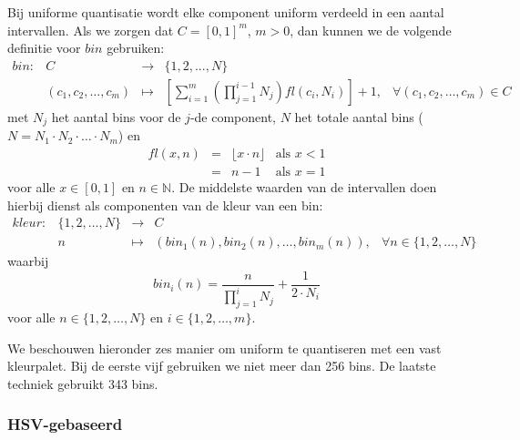 Bij uniforme quantisatie wordt elke component uniform verdeeld in een aantal intervallen.
Als we zorgen dat $C=[0,1]^m$, $m > 0$, dan kunnen we 
de volgende definitie voor $bin$ gebruiken:
$$
\begin{array}{lrcll}
bin: & C & \to & \{1,2,...,N\}\\
     & (c_1,c_2,\ldots,c_m) & \mapsto & \left[ \sum_{i=1}^m \left( \prod_{j=1}^{i-1} N_j \right) \mathit{fl}(c_i, N_i) \right] + 1, & \forall (c_1,c_2,\ldots,c_m) \in C
\end{array}
$$
met $N_j$ het aantal bins voor de $j$-de component, $N$ het totale aantal bins 
($N=N_1 \cdot N_2 \cdot \ldots \cdot N_m$) en
$$
\begin{array}{rcll}
\mathit{fl}(x,n) & = & \lfloor x \cdot n \rfloor & \textrm{als } x < 1 \\
				 & = & n - 1 & \textrm{als } x = 1
\end{array}
$$
voor alle $x \in [0,1]$ en $n \in \mathbb{N}$. De middelste waarden
van de intervallen doen hierbij dienst als componenten van de kleur van een bin:
$$
\begin{array}{lrcll}
kleur: & \{1,2,\ldots,N\} & \to & C \\
	   & n & \mapsto & (bin_1(n), bin_2(n), \dots, bin_m(n)), & \forall n \in \{1,2,\ldots,N\} 
\end{array}
$$
waarbij
$$
bin_i(n) = \frac{n}{\prod_{j=1}^i N_j} + \frac{1}{2 \cdot N_i}
$$
voor alle $n \in \{1,2,\ldots,N\}$ en $i \in \{1,2,\ldots,m\}$.

We beschouwen hieronder zes manier om uniform te quantiseren met een vast kleurpalet.  
Bij de eerste vijf gebruiken 
we niet meer dan 256 bins. De laatste techniek gebruikt 343 bins.

\subsubsection{HSV-gebaseerd}

